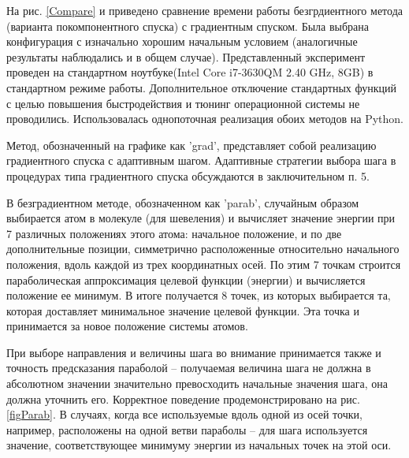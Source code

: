   На рис. \ref{Compare} и приведено сравнение времени работы безгрдиентного метода (варианта покомпонентного спуска) с градиентным спуском. Была выбрана конфигурация с изначально хорошим начальным условием (аналогичные результаты наблюдались и в общем случае). Представленный эксперимент проведен на стандартном ноутбуке(Intel Core i7-3630QM 2.40 GHz, 8GB) в стандартном режиме работы. Дополнительное отключение стандартных функций с целью повышения быстродействия и тюнинг операционной системы не проводились. Использовалась однопоточная реализация обоих методов на Python.

  Метод, обозначенный на графике как 'grad', представляет собой реализацию градиентного спуска с адаптивным шагом. Адаптивные стратегии выбора шага в процедурах типа градиентного спуска обсуждаются в заключительном п. 5. 
  \iffalse
  При движении в направлении возрастания значения составляющей градиента мы уменьшаем величину шага, оставляя 0.8 от предыдущего значения. При уменьшении составляющей градиента -- возвращаемся к начальному значению.


  \begin{algorithm}
  \caption{Градиетный спуск}
  \SetKwFunction{FMain}{Вычисление шага}
  \SetKwProg{Fn}{Function}{:}{}
    \Fn{\FMain{}}{
    $ x^{k+1} = x^k - h * p^k;$ \tcp{$ p^k = \nabla f\left( x^k \right) $}   

    {\eIf{$ p^k \leq p^{k-1} $ \tcp{ Сравнение по каждой координате}}
    	{$ h = h - h * 0.2;$}
    	{$ h = startStep;$ \tcp{В эксперименте startStep = 0.015(const)}}
    }
  }
  \end{algorithm}

  \fi

  В безградиентном методе, обозначенном как 'parab', случайным образом выбирается атом в молекуле (для шевеления) и вычисляет значение энергии при 7 различных положениях этого атома: начальное положение, и по две дополнительные позиции, симметрично расположенные относительно начального положения, вдоль каждой из трех координатных осей. По этим 7 точкам строится параболическая аппроксимация целевой функции (энергии) и вычисляется положение ее минимум. В итоге получается 8 точек, из которых выбирается та, которая доставляет минимальное значение целевой функции. Эта точка и принимается за новое положение системы атомов. 
  \iffalse
  По каждой из осей проводится экстраполяция параболой в зависимости от минимума которой и определяется возможная длина шага вдоль данной оси. После из полученных минимумов выбирается наименьший по значению энергии, который и используется для смещения выбранного атома. Иллюстрация одной итерации подобного подхода изображена на рис. \ref{figParab}. 
  \fi
  \iffalse
  При выборе направления и величины шага во внимание принимается также и точность предсказания параболой -- получаемая величина шага не должна в абсолютном значении значительно превосходить начальные значения шага, она должна уточнить его. Корректное поведение продемонстрировано на 
  рис. \ref{figParab}. 
  В случаях, когда все используемые вдоль одной из осей точки, например, расположены на одной ветви параболы -- для шага используется значение, соответствующее минимуму энергии из начальных точек на этой оси.


